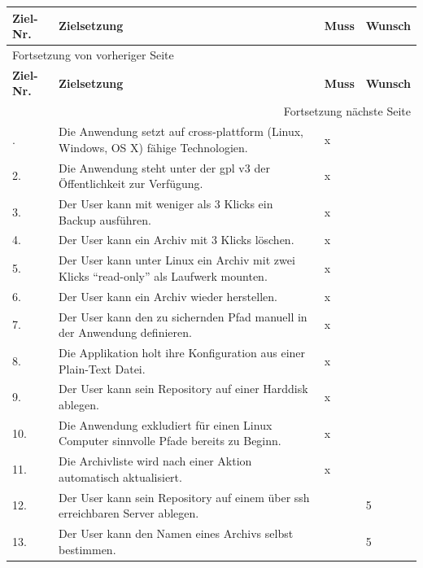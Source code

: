 \begin{longtable}{|p{1cm}|p{9cm}|p{1.5cm}|p{2cm}|}
\hline
\textbf{Ziel-Nr.}\cellcolor[HTML]{C0C0C0} & \textbf{Zielsetzung}\cellcolor[HTML]{C0C0C0} & \textbf{Muss}\cellcolor[HTML]{C0C0C0} & \textbf{Wunsch}\newline\cellcolor[HTML]{C0C0C0}\\
\hline
\endfirsthead
\multicolumn{4}{l}{Fortsetzung von vorheriger Seite} \\
\hline

\textbf{Ziel-Nr.}\cellcolor[HTML]{C0C0C0} & \textbf{Zielsetzung}\cellcolor[HTML]{C0C0C0} & \textbf{Muss}\cellcolor[HTML]{C0C0C0} & \textbf{Wunsch}\newline\cellcolor[HTML]{C0C0C0} \\

\hline
\endhead
\hline\multicolumn{4}{r}{Fortsetzung nächste Seite} \\
\endfoot
\endlastfoot
\hline
1. & Die Anwendung setzt auf cross-plattform (Linux, Windows, OS X) fähige Technologien. & x & \\
\hline
2. & Die Anwendung steht unter der \gls{gpl} v3 der Öffentlichkeit zur Verfügung. & x & \\
\hline
3. & Der User kann mit weniger als 3 Klicks ein Backup ausführen. & x & \\
\hline
4. & Der User kann ein Archiv mit 3 Klicks löschen. & x & \\
\hline
5. & Der User kann unter Linux ein Archiv mit zwei Klicks "`read-only"' als Laufwerk mounten. & x & \\
\hline
6. & Der User kann ein Archiv wieder herstellen. & x & \\
\hline
7. & Der User kann den zu sichernden Pfad manuell in der Anwendung definieren. & x & \\
\hline
8. & Die Applikation holt ihre Konfiguration aus einer Plain-Text Datei. & x & \\
\hline
9. & Der User kann sein Repository auf einer Harddisk ablegen. & x & \\
\hline
10. & Die Anwendung exkludiert für einen Linux Computer sinnvolle Pfade bereits zu Beginn. & x & \\
\hline
11. & Die Archivliste wird nach einer Aktion automatisch aktualisiert. & x & \\
\hline
12. & Der User kann sein Repository auf einem über \gls{ssh} erreichbaren Server ablegen. &  & 5\\
\hline
13. & Der User kann den Namen eines Archivs selbst bestimmen. &  & 5\\

\end{longtable}
